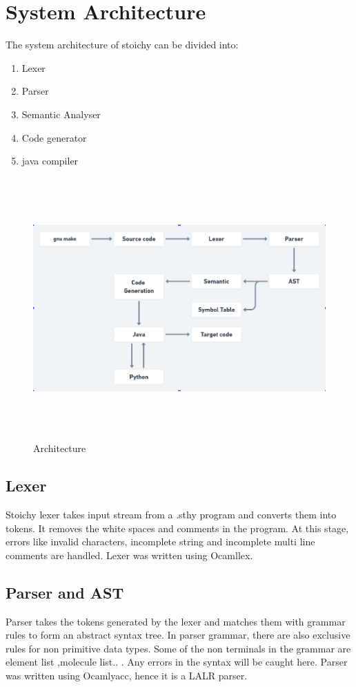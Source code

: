 \documentclass[english,a4paper,12pt]{report}
\begin{document}
 \chapter{System Architecture}
The system architecture of stoichy can be divided into:
\begin{enumerate}
\item Lexer
\item Parser
\item Semantic Analyser
\item Code generator
\item java compiler
\end{enumerate}
\begin{figure}[h!]
 \includegraphics[width=15cm, height =10cm,keepaspectratio]{pictures/Screenshot from 2020-12-18 20-30-12.png}
 \caption{Architecture}
\end{figure}
\section{Lexer}
Stoichy lexer takes input stream from a .sthy program and converts them into tokens. It removes the white spaces and comments in the program. At this stage, errors like invalid characters, incomplete string and incomplete multi line comments are handled. Lexer was written using Ocamllex.

\section{Parser and AST}
Parser takes the tokens generated by the lexer and matches them with grammar rules to form an abstract syntax tree. In parser grammar, there are also exclusive rules for non primitive data types. Some of the non terminals in the grammar are element list ,molecule list.. . Any errors in the syntax will be caught here. Parser was written using Ocamlyacc, hence it is a LALR parser.
\end{document}
